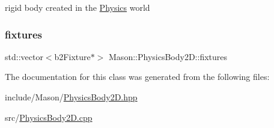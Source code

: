 rigid body created in the \hyperlink{class_mason_1_1_physics}{Physics} world 

\hypertarget{class_mason_1_1_physics_body2_d_a73a0ad2e2b91022137c6ba8abe1fb51b}{}\label{class_mason_1_1_physics_body2_d_a73a0ad2e2b91022137c6ba8abe1fb51b} 
\subsubsection{\texorpdfstring{fixtures}{fixtures}}
{\footnotesize\ttfamily std\+::vector$<$b2\+Fixture$\ast$$>$ Mason\+::\+Physics\+Body2\+D\+::fixtures\hspace{0.3cm}{\ttfamily [protected]}}



The documentation for this class was generated from the following files\+:\begin{DoxyCompactItemize}
\item 
include/\+Mason/\hyperlink{_physics_body2_d_8hpp}{Physics\+Body2\+D.\+hpp}\item 
src/\hyperlink{_physics_body2_d_8cpp}{Physics\+Body2\+D.\+cpp}\end{DoxyCompactItemize}
